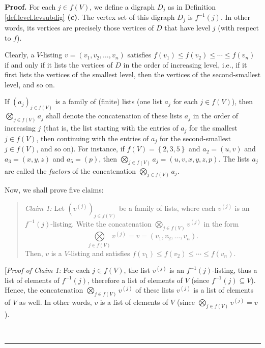 \documentclass[numbers=enddot,12pt,final,onecolumn,notitlepage]{scrartcl}%
\numberwithin{exer}{section}
\theoremstyle{definition}
\newenvironment{statement}{\begin{quote}}{\end{quote}}
\newenvironment{proof}[1][Proof]{\noindent\textbf{#1.} }{\ \rule{0.5em}{0.5em}}
\newenvironment{verlong}{}{}
\begin{document}
\begin{verlong}


\begin{proof}
For each $j\in f\left(  V\right)  $, we define a digraph $D_{j}$ as in
Definition \ref{def.level.levsubdig} \textbf{(c)}. The vertex set of this
digraph $D_{j}$ is $f^{-1}\left(  j\right)  $. In other words, its vertices
are precisely those vertices of $D$ that have level $j$ (with respect to $f$).

Clearly, a $V$-listing $v=\left(  v_{1},v_{2},\ldots,v_{n}\right)  $ satisfies
$f\left(  v_{1}\right)  \leq f\left(  v_{2}\right)  \leq\cdots\leq f\left(
v_{n}\right)  $ if and only if it lists the vertices of $D$ in the order of
increasing level, i.e., if it first lists the vertices of the smallest level,
then the vertices of the second-smallest level, and so on.

If $\left(  a_{j}\right)  _{j\in f\left(  V\right)  }$ is a family of (finite)
lists (one list $a_{j}$ for each $j\in f\left(  V\right)  $), then
$\bigotimes\limits_{j\in f\left(  V\right)  }a_{j}$ shall denote the
concatenation of these lists $a_{j}$ in the order of increasing $j$ (that is,
the list starting with the entries of $a_{j}$ for the smallest $j\in f\left(
V\right)  $, then continuing with the entries of $a_{j}$ for the
second-smallest $j\in f\left(  V\right)  $, and so on). For instance, if
$f\left(  V\right)  =\left\{  2,3,5\right\}  $ and $a_{2}=\left(  u,v\right)
$ and $a_{3}=\left(  x,y,z\right)  $ and $a_{5}=\left(  p\right)  $, then
$\bigotimes\limits_{j\in f\left(  V\right)  }a_{j}=\left(  u,v,x,y,z,p\right)
$. The lists $a_{j}$ are called the \emph{factors} of the concatenation
$\bigotimes\limits_{j\in f\left(  V\right)  }a_{j}$.

Now, we shall prove five claims:

\begin{statement}
\textit{Claim 1:} Let $\left(  v^{\left(  j\right)  }\right)  _{j\in f\left(
V\right)  }$ be a family of lists, where each $v^{\left(  j\right)  }$ is an
$f^{-1}\left(  j\right)  $-listing. Write the concatenation $\bigotimes
\limits_{j\in f\left(  V\right)  }v^{\left(  j\right)  }$ in the form%
\[
\bigotimes\limits_{j\in f\left(  V\right)  }v^{\left(  j\right)  }=v=\left(
v_{1},v_{2},\ldots,v_{n}\right)  .
\]
Then, $v$ is a $V$-listing and satisfies $f\left(  v_{1}\right)  \leq f\left(
v_{2}\right)  \leq\cdots\leq f\left(  v_{n}\right)  $.
\end{statement}

[\textit{Proof of Claim 1:} For each $j\in f\left(  V\right)  $, the list
$v^{\left(  j\right)  }$ is an $f^{-1}\left(  j\right)  $-listing, thus a list
of elements of $f^{-1}\left(  j\right)  $, therefore a list of elements of $V$
(since $f^{-1}\left(  j\right)  \subseteq V$). Hence, the concatenation
$\bigotimes\limits_{j\in f\left(  V\right)  }v^{\left(  j\right)  }$ of these
lists $v^{\left(  j\right)  }$ is a list of elements of $V$ as well. In other
words, $v$ is a list of elements of $V$ (since $\bigotimes\limits_{j\in
f\left(  V\right)  }v^{\left(  j\right)  }=v$).


\end{proof}
\end{verlong}
\end{document}

